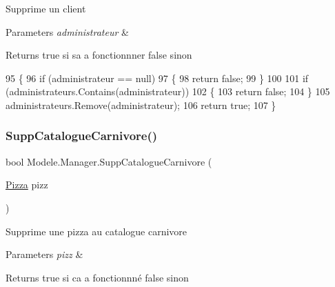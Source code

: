 Supprime un client 


\begin{DoxyParams}{Parameters}
{\em administrateur} & \\
\hline
\end{DoxyParams}
\begin{DoxyReturn}{Returns}
true si sa a fonctionnner false sinon
\end{DoxyReturn}

\begin{DoxyCode}
95         \{
96             \textcolor{keywordflow}{if} (administrateur == null)
97             \{
98                 \textcolor{keywordflow}{return} \textcolor{keyword}{false};
99             \}
100 
101             \textcolor{keywordflow}{if} (administrateurs.Contains(administrateur))
102             \{
103                 \textcolor{keywordflow}{return} \textcolor{keyword}{false};
104             \}
105             administrateurs.Remove(administrateur);
106             \textcolor{keywordflow}{return} \textcolor{keyword}{true};
107         \}
\end{DoxyCode}
\mbox{\label{classModele_1_1Manager_aac1f92fbb473703125ba41e9903f808e}} 
\subsubsection{\texorpdfstring{Supp\+Catalogue\+Carnivore()}{SuppCatalogueCarnivore()}}
{\footnotesize\ttfamily bool Modele.\+Manager.\+Supp\+Catalogue\+Carnivore (\begin{DoxyParamCaption}\item[{\hyperlink{classModele_1_1Pizza}{Pizza}}]{pizz }\end{DoxyParamCaption})\hspace{0.3cm}{\ttfamily [inline]}}



Supprime une pizza au catalogue carnivore 


\begin{DoxyParams}{Parameters}
{\em pizz} & \\
\hline
\end{DoxyParams}
\begin{DoxyReturn}{Returns}
true si ca a fonctionnné false sinon
\end{DoxyReturn}

